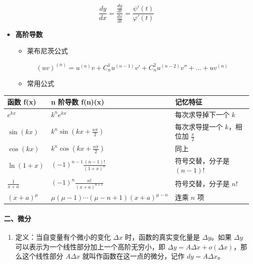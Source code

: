 \documentclass[
]{article}
\newcounter{none} %
\begin{document}
\[\frac{dy}{dx} = \frac{\frac{dy}{dt}}{\frac{dx}{dt}} = \frac{\psi'(t)}{\varphi'(t)}\]

\begin{itemize}
\item
  \textbf{高阶导数}

  \begin{itemize}
  \item
    莱布尼茨公式
  \end{itemize}

  \[(uv)^{(n)} = u^{(n)}v + C_n^1 u^{(n-1)}v' + C_n^2 u^{(n-2)}v'' + \dots + u v^{(n)}\]

  \begin{itemize}
  \item
    常用公式
  \end{itemize}
\end{itemize}

{\def\LTcaptype{none} %
\begin{longtable}[]{@{}lll@{}}
\toprule\noalign{}
\textbf{函数 f(x)} & \textbf{n 阶导数 f(n)(x)} & \textbf{记忆特征} \\
\midrule\noalign{}
\endhead
\bottomrule\noalign{}
\endlastfoot
\textbf{\(e^{kx}\)} & \(k^n e^{kx}\) & 每次求导掉下一个 \(k\) \\
\textbf{\(\sin(kx)\)} & \(k^n \sin(kx + \frac{n\pi}{2})\) &
每次求导提一个 \(k\)，相位加 \(\frac{\pi}{2}\) \\
\textbf{\(\cos(kx)\)} & \(k^n \cos(kx + \frac{n\pi}{2})\) & 同上 \\
\textbf{\(\ln(1+x)\)} & \((-1)^{n-1} \frac{(n-1)!}{(1+x)^n}\) &
符号交替，分子是 \((n-1)!\) \\
\textbf{\(\frac{1}{x+a}\)} & \((-1)^n \frac{n!}{(x+a)^{n+1}}\) &
符号交替，分子是 \(n!\) \\
\textbf{\((x+a)^\mu\)} & \(\mu(\mu-1)\cdots(\mu-n+1)(x+a)^{\mu-n}\) &
连乘 \(n\) 项 \\
\end{longtable}
}

\paragraph{二、微分}\label{ux4e8cux5faeux5206}

\begin{enumerate}
\def\labelenumi{\arabic{enumi}.}
\item
  定义：当自变量有个微小的变化 \(\Delta x\) 时，函数的真实变化量是
  \(\Delta y\)。如果 \(\Delta y\)
  可以表示为一个线性部分加上一个高阶无穷小，即
  \(\Delta y = A\Delta x + o(\Delta x)\)，那么这个线性部分 \(A\Delta x\)
  就叫作函数在这一点的微分，记作 \(dy=A\Delta x\)。
\end{enumerate}
\end{document}
